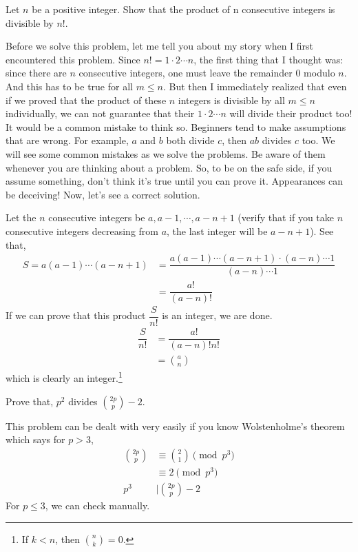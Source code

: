 \begin{problem}\label{prob:productdividesfactorial}
	Let $n$ be a positive integer. Show that the product of n consecutive integers is divisible by $n!$.
\end{problem}
Before we solve this problem, let me tell you about my story when I first encountered this problem. Since $n!=1\cdot2\cdots n$, the first thing that I thought was: since there are $n$ consecutive integers, one must leave the remainder $0$ modulo $n$. And this has to be true for all $m\leq n$. But then I immediately realized that even if we proved that the product of these $n$ integers is divisible by all $m\leq n$ individually, we can not guarantee that their $1\cdot2\cdots n$ will divide their product too! It would be a common mistake to think so. Beginners tend to make assumptions that are wrong. For example, $a$ and $b$ both divide $c$, then $ab$ divides $c$ too. We will see some common mistakes as we solve the problems. Be aware of them whenever you are thinking about a problem. So, to be on the safe side, if you assume something, don't think it's true until you can prove it. Appearances can be deceiving! Now, let's see a correct solution.
\begin{solution}
	Let the $n$ consecutive integers be $a,a-1,\cdots,a-n+1$ (verify that if you take $n$ consecutive integers decreasing from $a$, the last integer will be $a-n+1$). See that,
		\begin{align*}
			S=a(a-1)\cdots(a-n+1) & = \dfrac{a(a-1)\cdots(a-n+1)\cdot(a-n)\cdots1}{(a-n)\cdots1}\\
								& = \dfrac{a!}{(a-n)!}
		\end{align*}
	If we can prove that this product $\dfrac{S}{n!}$ is an integer, we are done.
		\begin{align*}
			\dfrac{S}{n!} & = \dfrac{a!}{(a-n)!n!}\\
				  & = \binom{a}{n}
		\end{align*}
	which is clearly an integer.\footnote{If $k<n$, then $\binom{n}{k}=0$.}
\end{solution}

\begin{problem}
	Prove that, $p^2$ divides $\binom{2p}{p}-2$.
\end{problem}

\begin{solution}
	This problem can be dealt with very easily if you know Wolstenholme's theorem which says for $p>3$,
		\begin{align*}
			\binom{2p}{p} & \equiv\binom{2}{1}\pmod{p^3}\\
				  & \equiv2\pmod{p^3}\\
					p^3 & \mid \binom{2p}p-2
		\end{align*}
	For $p\leq3$, we can check manually.
\end{solution}

